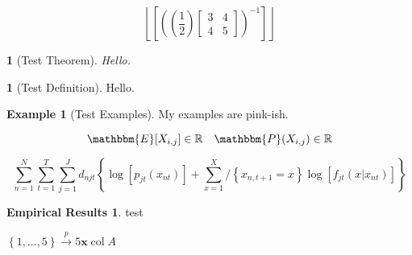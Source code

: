 \documentclass[11pt]{article}
\numberwithin{equation}{section}
\theoremstyle{plain}
\newtheorem{theorem}{\color{ForestGreen}{\textbf{Theorem}}}[section]
\theoremstyle{definition}
\newtheorem{definition}{\color{MidnightBlue}{\textbf{Definition}}}[section]
\newtheorem{example}{\color{WildStrawberry}Example}[section]
\newtheorem*{eresults}{Empirical Results}
\newcommand\parens[1]{\left( #1 \right)}
\newcommand\squares[1]{\left[ #1 \right]}
\newcommand\braces[1]{\left\{ #1 \right\}}
\newcommand\floor[1]{\left\lfloor #1 \right\rfloor}
\newcommand\vect[1]{\mathbf{#1}}
\newcommand\inv[1]{#1^{-1}}
\def\Set{\set*}%
\newcommand\intsfin[1]{\braces{1, \ldots, #1}}
\newcommand{\toprob}{\stackrel { p } {\to} }
\newcommand{\1}{\mathbbm 1}
\def\vx{\vect{x}}
\newcommand{\RR}{\mathbb R}
\newcommand{\ee}[1]{\mathbbm{E}[{#1}]}
\newcommand{\pp}[1]{\mathbbm{P}({#1})}
\def\cA{\col{A}}
\DeclareMathOperator{\col}{col}
\begin{document}
\newpage


\begin{equation}
	\floor{\squares{\inv{\parens{\parens{\frac{1}{2}} \begin{bmatrix} 3 & 4 \\ 4 & 5\end{bmatrix} }}}}
\end{equation}


\begin{theorem}[Test Theorem]
	Hello.
\end{theorem}

\begin{definition}[Test Definition]
	Hello.
\end{definition}

\begin{example}[Test Examples]
	My examples are pink-ish.
\end{example}

\begin{equation}
	\ee{X_{i,j}} \in \RR \quad \pp{X_{i,j}} \in \RR
\end{equation}



\begin{equation}
\sum_{n=1}^{N} \sum_{t=1}^{T} \sum_{j=1}^{J} d_{n j t}\left\{\log \left[p_{j t}\left(x_{n t}\right)\right]+\sum_{x=1}^{X} /\left\{x_{n, t+1}=x\right\} \log \left[f_{j t}\left(x | x_{n t}\right)\right]\right\}
\end{equation}

\begin{eresults}
test
\end{eresults}

$\intsfin{5} \toprob{5} \vx \cA$


\newpage 
\listoftodos
\end{document}
